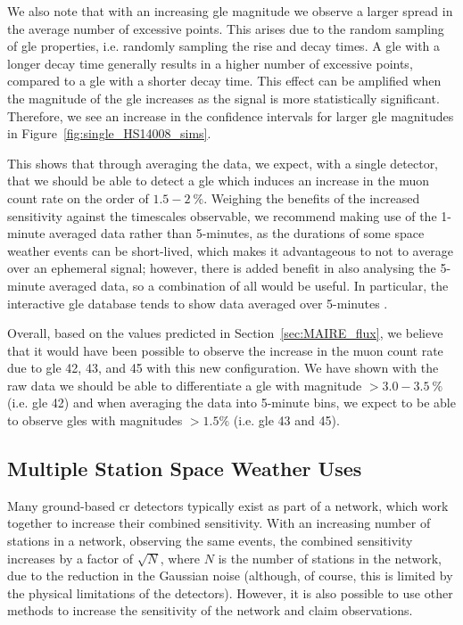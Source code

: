 We also note that with an increasing \gls{gle} magnitude we observe a larger spread in the average number of excessive points. This arises due to the random sampling of \gls{gle} properties, i.e. randomly sampling the rise and decay times. A \gls{gle} with a longer decay time generally results in a higher number of excessive points, compared to a \gls{gle} with a shorter decay time. This effect can be amplified when the magnitude of the \gls{gle} increases as the signal is more statistically significant. Therefore, we see an increase in the confidence intervals for larger \gls{gle} magnitudes in Figure~\ref{fig:single_HS14008_sims}.


This shows that through averaging the data, we expect, with a single detector, that we should be able to detect a \gls{gle} which induces an increase in the muon count rate on the order of $1.5-2~\%$. Weighing the benefits of the increased sensitivity against the timescales observable, we recommend making use of the 1-minute averaged data rather than 5-minutes, as the durations of some space weather events can be short-lived, which makes it advantageous to not to average over an ephemeral signal; however, there is added benefit in also analysing the 5-minute averaged data, so a combination of all would be useful. In particular, the interactive \gls{gle} database tends to show data averaged over 5-minutes \citep{usoskin_database_2016}.

Overall, based on the values predicted in Section~\ref{sec:MAIRE_flux}, we believe that it would have been possible to observe the increase in the muon count rate due to \gls{gle} 42, 43, and 45 with this new configuration. We have shown with the raw data we should be able to differentiate a \gls{gle} with magnitude $>3.0-3.5~\%$ (i.e. \gls{gle} 42) and when averaging the data into 5-minute bins, we expect to be able to observe \glspl{gle} with magnitudes $> 1.5 \%$  (i.e. \gls{gle} 43 and 45). 


\subsection{Multiple Station Space Weather Uses}\label{sec:HS_14008_multi_sims}


Many ground-based \gls{cr} detectors typically exist as part of a network, which work together to increase their combined sensitivity. With an increasing number of stations in a network, observing the same events, the combined sensitivity increases by a factor of $\sqrt{N}$, where $N$ is the number of stations in the network, due to the reduction in the Gaussian noise (although, of course, this is limited by the physical limitations of the detectors). However, it is also possible to use other methods to increase the sensitivity of the network and claim observations.

